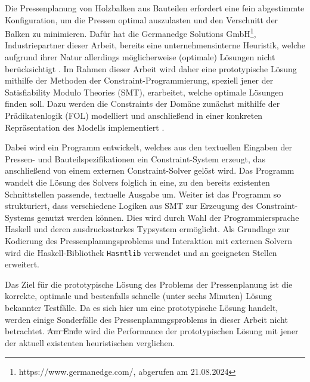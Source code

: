 \abstract
\label{Abstrakt}

Die Pressenplanung von Holzbalken aus Bauteilen erfordert eine fein abgestimmte Konfiguration, um die Pressen optimal auszulasten und den Verschnitt der Balken zu minimieren.
Dafür hat die Germanedge Solutions GmbH\footnote{https://www.germanedge.com/, abgerufen am 21.08.2024}, Industriepartner dieser Arbeit, bereits eine unternehmensinterne Heuristik, welche aufgrund ihrer Natur allerdings möglicherweise (optimale) Lösungen nicht berücksichtigt .
Im Rahmen dieser Arbeit wird daher eine prototypische Lösung mithilfe der Methoden der Constraint-Programmierung, speziell jener der Satisfiability Modulo Theories (SMT), erarbeitet, welche optimale Lösungen finden soll.
Dazu werden die Constraints der Domäne zunächst mithilfe der Prädikatenlogik (FOL) modelliert und anschließend in einer konkreten Repräsentation des Modells implementiert .

Dabei wird ein Programm entwickelt, welches aus den textuellen Eingaben der Pressen- und Bauteilspezifikationen ein Constraint-System erzeugt, das anschließend von einem externen Constraint-Solver gelöst wird.
Das Programm wandelt die Lösung des Solvers folglich in eine, zu den bereits existenten Schnittstellen passende, textuelle Ausgabe um.
Weiter ist das Programm so strukturiert, dass verschiedene Logiken aus SMT zur Erzeugung des Constraint-Systems genutzt werden können.
Dies wird durch Wahl der Programmiersprache Haskell und deren ausdrucksstarkes Typsystem ermöglicht.
Als Grundlage zur Kodierung des Pressenplanungsproblems und Interaktion mit externen Solvern
wird die Haskell-Bibliothek \texttt{Hasmtlib} \cite{hasmtlib} verwendet und an geeigneten Stellen erweitert.

Das Ziel für die prototypische Lösung des Problems der Pressenplanung ist die korrekte, optimale und bestenfalls schnelle (unter sechs Minuten) Lösung bekannter Testfälle.
Da es sich hier um eine prototypische Lösung handelt, werden einige Sonderfälle des Pressenplanungsproblems in dieser Arbeit nicht betrachtet.
\sout{Am Ende}  wird die Performance der prototypischen Lösung mit jener der aktuell existenten heuristischen verglichen.
